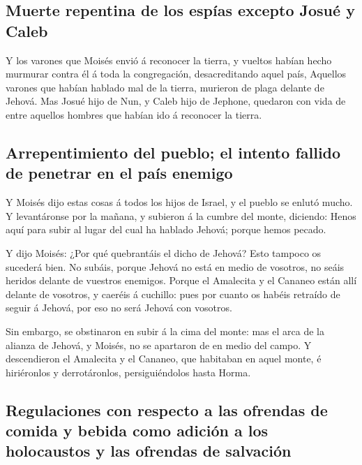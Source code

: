 \hypertarget{muerte-repentina-de-los-espuxedas-excepto-josuuxe9-y-caleb}{%
\subsection{Muerte repentina de los espías excepto Josué y
Caleb}\label{muerte-repentina-de-los-espuxedas-excepto-josuuxe9-y-caleb}}

 Y los varones que Moisés envió á reconocer la tierra, y
vueltos habían hecho murmurar contra él á toda la congregación,
desacreditando aquel país,  Aquellos varones que habían
hablado mal de la tierra, murieron de plaga delante de Jehová.
 Mas Josué hijo de Nun, y Caleb hijo de Jephone, quedaron
con vida de entre aquellos hombres que habían ido á reconocer la tierra.

\hypertarget{arrepentimiento-del-pueblo-el-intento-fallido-de-penetrar-en-el-pauxeds-enemigo}{%
\subsection{Arrepentimiento del pueblo; el intento fallido de penetrar
en el país
enemigo}\label{arrepentimiento-del-pueblo-el-intento-fallido-de-penetrar-en-el-pauxeds-enemigo}}

 Y Moisés dijo estas cosas á todos los hijos de Israel, y
el pueblo se enlutó mucho.  Y levantáronse por la mañana, y
subieron á la cumbre del monte, diciendo: Henos aquí para subir al lugar
del cual ha hablado Jehová; porque hemos pecado.

 Y dijo Moisés: ¿Por qué quebrantáis el dicho de Jehová?
Esto tampoco os sucederá bien.  No subáis, porque Jehová no
está en medio de vosotros, no seáis heridos delante de vuestros
enemigos.  Porque el Amalecita y el Cananeo están allí
delante de vosotros, y caeréis á cuchillo: pues por cuanto os habéis
retraído de seguir á Jehová, por eso no será Jehová con vosotros.

 Sin embargo, se obstinaron en subir á la cima del monte:
mas el arca de la alianza de Jehová, y Moisés, no se apartaron de en
medio del campo.  Y descendieron el Amalecita y el Cananeo,
que habitaban en aquel monte, é hiriéronlos y derrotáronlos,
persiguiéndolos hasta Horma.

\hypertarget{regulaciones-con-respecto-a-las-ofrendas-de-comida-y-bebida-como-adiciuxf3n-a-los-holocaustos-y-las-ofrendas-de-salvaciuxf3n}{%
\subsection{Regulaciones con respecto a las ofrendas de comida y bebida
como adición a los holocaustos y las ofrendas de
salvación}\label{regulaciones-con-respecto-a-las-ofrendas-de-comida-y-bebida-como-adiciuxf3n-a-los-holocaustos-y-las-ofrendas-de-salvaciuxf3n}}

